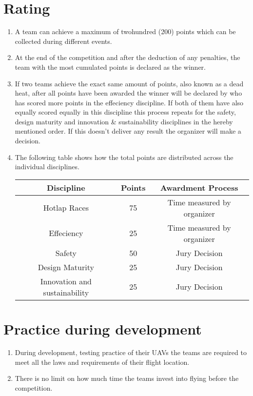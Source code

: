     \section{Rating}
    \begin{enumerate}
      \item A team can achieve a maximum of twohundred (200) points which can be collected during different events.
      \item At the end of the competition and after the deduction of any penalties, the team with the most cumulated points is declared as the winner. 
      \item If two teams achieve the exact same amount of points, also known as a dead heat, after all points have been awarded the winner will be declared by who has scored more points in the effeciency discipline. 
      If both of them have also equally scored equally in this discipline this process repeats for the safety, design maturity and innovation \& sustainability disciplines in the hereby mentioned order. If this doesn't deliver any result the organizer will make a decision. 
      \item The following table shows how the total points are distributed across the individual disciplines. 

      \begin{center}
        \begin{tabular}{|c|c|c|} 
          \hline
          Discipline & Points & Awardment Process \\ 
          \hline
          Hotlap Races & 75 & Time measured by organizer \\ 
          \hline
          Effeciency & 25 & Time measured by organizer \\ 
          \hline
          Safety & 50 & Jury Decision \\ 
          \hline
          Design Maturity & 25 & Jury Decision \\ 
          \hline
          Innovation and sustainability & 25 & Jury Decision \\ 
          \hline
        \end{tabular}
      \end{center}


    \end{enumerate}

    \section{Practice during development}
    \begin{enumerate}
      \item During development, testing practice of their UAVs the teams are required to meet all the laws and requirements of their flight location. 
      \item There is no limit on how much time the teams invest into flying before the competition. 
    \end{enumerate}

